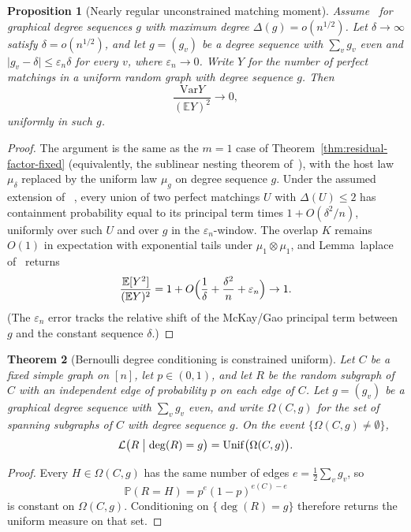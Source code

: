 \documentclass[11pt]{article}
\newtheorem{theorem}{Theorem}
\newtheorem{proposition}[theorem]{Proposition}
\newcommand{\EE}{\mathbb{E}}
\newcommand{\PP}{\mathbb{P}}
\newcommand{\Var}{\mathrm{Var}}
\begin{document}
\begin{proposition}[Nearly regular unconstrained matching moment]
\label{prop:residual-nearly-regular-matching}
Assume~\cite[Theorem~6]{Gao20} for graphical degree sequences \(g\) with
maximum degree \(\Delta(g)=o(n^{1/2})\). Let \(\delta\to\infty\) satisfy
\(\delta=o(n^{1/2})\), and let \(g=(g_v)\) be a degree sequence with
\(\sum_v g_v\) even and \(\lvert g_v-\delta\rvert\le\varepsilon_n\delta\) for every
\(v\), where \(\varepsilon_n\to0\). Write \(Y\) for the number of perfect matchings
in a uniform random graph with degree sequence \(g\). Then
\[
\frac{\Var Y}{(\EE Y)^2}\to0,
\]
uniformly in such \(g\).
\end{proposition}

\begin{proof}
The argument is the same as the \(m=1\) case of
Theorem~\ref{thm:residual-factor-fixed} (equivalently, the sublinear nesting
theorem of~\cite{PlusOneV1}), with the host law \(\mu_\delta\) replaced by the
uniform law \(\mu_g\) on degree sequence \(g\). Under the assumed extension of
~\cite[Theorem~6]{Gao20}, every union of two perfect matchings \(U\) with
\(\Delta(U)\le2\) has containment probability equal to its principal term times
\(1+O(\delta^2/n)\), uniformly over such \(U\) and over \(g\) in the
\(\varepsilon_n\)-window. The overlap \(K\) remains \(O(1)\) in expectation with
exponential tails under \(\mu_1\otimes\mu_1\), and Lemma~laplace
of~\cite{PlusOneV1} returns
\[
\frac{\EE[Y^2]}{(\EE Y)^2}
=
1+O\Bigl(\frac1\delta+\frac{\delta^2}{n}+\varepsilon_n\Bigr)
\to1.
\]
(The \(\varepsilon_n\) error tracks the relative shift of the McKay/Gao principal
term between \(g\) and the constant sequence \(\delta\).)
\end{proof}

\begin{theorem}[Bernoulli degree conditioning is constrained uniform]
\label{thm:bern-degree-uniform}
Let \(C\) be a fixed simple graph on \([n]\), let \(p\in(0,1)\), and let \(R\) be
the random subgraph of \(C\) with an independent edge of probability \(p\) on
each edge of \(C\). Let \(g=(g_v)\) be a graphical degree sequence with
\(\sum_v g_v\) even, and write \(\Omega(C,g)\) for the set of spanning subgraphs
of \(C\) with degree sequence \(g\). On the event \(\{\Omega(C,g)\ne\emptyset\}\),
\[
\mathcal{L}\bigl(R\bigm|\deg(R)=g\bigr)
=
\mathrm{Unif}\bigl(\Omega(C,g)\bigr).
\]
\end{theorem}

\begin{proof}
Every \(H\in\Omega(C,g)\) has the same number of edges
\(e=\tfrac12\sum_v g_v\), so
\[
\PP(R=H)
=
p^e(1-p)^{e(C)-e}
\]
is constant on \(\Omega(C,g)\). Conditioning on \(\{\deg(R)=g\}\) therefore
returns the uniform measure on that set.
\end{proof}
\end{document}
